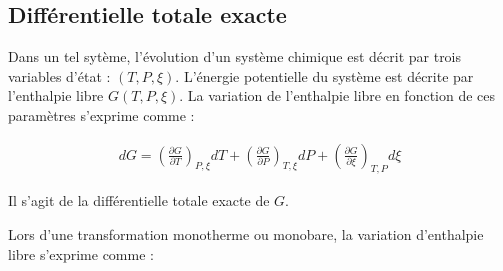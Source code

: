 



\subsection{Différentielle totale exacte}

Dans un tel sytème, l'évolution d'un système chimique est décrit par trois variables d'état : $(T, P, \xi)$. L'énergie potentielle du système est décrite par l'enthalpie libre $G( T, P, \xi )$. La variation de l'enthalpie libre en fonction de ces paramètres s'exprime comme : 

\begin{align}
dG = \left( \frac{\partial G}{\partial T} \right)_{P, \xi} dT + \left( \frac{\partial G}{\partial P} \right)_{T, \xi} dP + \left( \frac{\partial G}{\partial \xi} \right)_{T,P} d\xi
\end{align}

Il s'agit de la différentielle totale exacte de $G$.





Lors d'une transformation monotherme ou monobare, la variation d'enthalpie libre s'exprime comme : 

